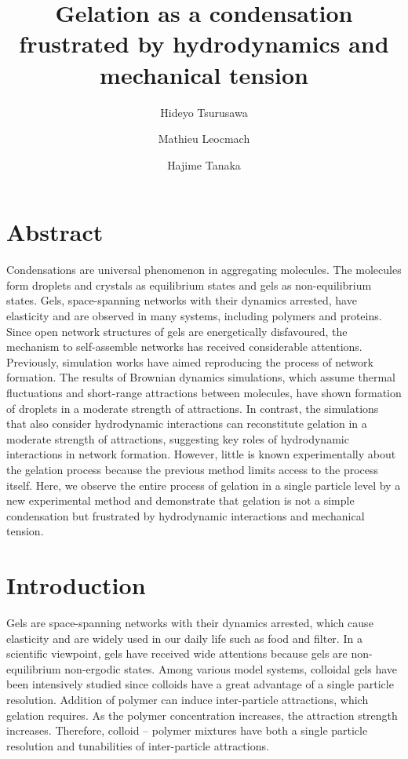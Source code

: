 



\title{Gelation as a condensation frustrated by hydrodynamics and mechanical tension}
\author{Hideyo Tsurusawa}
\author{Mathieu Leocmach}
\author{Hajime Tanaka}
\maketitle

\section{Abstract}
Condensations are universal phenomenon in aggregating molecules.
The molecules form droplets and crystals as equilibrium states and gels as non-equilibrium states.
Gels, space-spanning networks with their dynamics arrested, have elasticity and are observed in many systems, including polymers and proteins.
Since open network structures of gels are energetically disfavoured, the mechanism to self-assemble networks has received considerable attentions.
Previously, simulation works have aimed reproducing the process of network formation.
The results of Brownian dynamics simulations, which assume thermal fluctuations and short-range attractions between molecules, have shown formation of droplets in a moderate strength of attractions.
In contrast, the simulations that also consider hydrodynamic interactions can reconstitute gelation in a moderate strength of attractions, suggesting key roles of hydrodynamic interactions in network formation.
However, little is known experimentally about the gelation process because the previous method limits access to the process itself.
Here, we observe the entire process of gelation in a single particle level by a new experimental method and demonstrate that gelation is not a simple condensation but frustrated by hydrodynamic interactions and mechanical tension.

\section{Introduction} %
Gels are space-spanning networks with their dynamics arrested, which cause elasticity and are widely used in our daily life such as food and filter.
In a scientific viewpoint, gels have received wide attentions because gels are non-equilibrium non-ergodic states.
Among various model systems, colloidal gels have been intensively studied since colloids have a great advantage of a single particle resolution.
Addition of polymer can induce inter-particle attractions, which gelation requires.
As the polymer concentration increases, the attraction strength increases.
Therefore, colloid – polymer mixtures have both a single particle resolution and tunabilities of inter-particle attractions.



